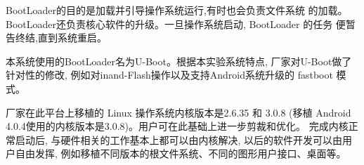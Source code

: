 BootLoader的目的是加载并引导操作系统运行,有时也会负责文件系统
的加载。BootLoader还负责核心软件的升级。一旦操作系统启动, BootLoader 的任务
便暂告终结,直到系统重启。

本系统使用的BootLoader名为U-Boot。根据本实验系统特点, 厂家对U-Boot做了
针对性的修改, 例如对inand-Flash操作以及支持Android系统升级的 fastboot 模式。

厂家在此平台上移植的 Linux 操作系统内核版本是2.6.35 和 3.0.8 (移植
Android 4.0.4使用的内核版本是3.0.8)。用户可在此基础上进一步剪裁和优化。
完成内核正常启动后,
与硬件相关的工作基本上都可以由内核解决, 以后的软件开发可以由用户自由发挥,
例如移植不同版本的根文件系统、不同的图形用户接口、桌面等。
